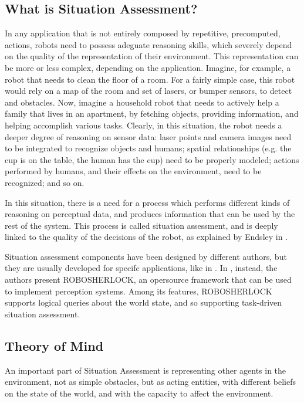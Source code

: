 \subsection{What is Situation Assessment?}
In any application that is not entirely composed by repetitive, precomputed, actions, robots need to possess adeguate reasoning skills, which severely depend on the quality of the representation of their environment. This representation can be more or less complex, depending on the application. Imagine, for example, a robot that needs to clean the floor of a room. For a fairly simple case, this robot would rely on a map of the room and set of lasers, or bumper sensors, to detect and obstacles. Now, imagine a household robot that needs to actively help a family that lives in an apartment, by fetching objects, providing information, and helping accomplish various tasks. Clearly, in this situation, the robot needs a deeper degree of reasoning on sensor data: laser points and camera images need to be integrated to recognize objects and humans; spatial relationships  (e.g. the cup is on the table, the human has the cup) need to be properly modeled; actions performed by humans, and their effects on the environment, need to be recognized; and so on. 

In this situation, there is a need for a process which performs different kinds of reasoning on perceptual data, and produces information that can be used by the rest of the system. This process is called situation assessment, and is deeply linked to the quality of the decisions of the robot, as explained by Endsley in \cite{endsley1995toward}. 


Situation assessment components have been designed by different authors, but they are usually developed for specifc applications, like in \cite{Chella2010,Kluge01situationassessment}. In \cite{beetz2015robosherlock}, instead, the authors present ROBOSHERLOCK, an opersource framework that can be used to implement perception systems. Among its features, ROBOSHERLOCK supports logical queries about the world state, and so supporting task-driven situation assessment. 

\subsection{Theory of Mind}
An important part of Situation Assessment is representing other agents in the environment, not as simple obstacles, but as acting entities, with different beliefs on the state of the world, and with the capacity to affect the environment. 

